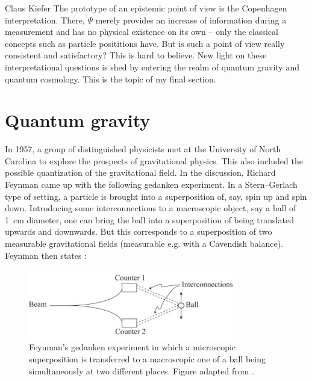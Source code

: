 \begin{artengenv}{Claus Kiefer}
The prototype of an epistemic point of view is the Copenhagen
interpretation. There, $\Psi$ merely provides an increase of information
during a measurement and has no physical existence on its own -- only
the classical concepts such as particle posititions have. But is such
a point of view really consistent and satisfactory?  This is hard to
believe. New light on these interpretational questions is shed by
entering the realm of quantum gravity and quantum cosmology. This is
the topic of my final section.

 

\section{Quantum gravity}


In 1957, a group of distinguished physicists met at the University of
North Carolina to explore the prospects of gravitational physics.
This also included the possible quantization of the
gravitational field. In the discussion, Richard Feynman came up with
the following 
gedanken experiment. In a Stern--Gerlach type of setting, a particle
is brought into a superposition of, say, spin up and spin
down. Introducing some interconnections to a macroscopic object, say
a ball of 1~cm diameter, one can bring the ball into a superposition of being
translated upwards and downwards. But this corresponds to a
superposition of two measurable gravitational fields (measurable e.g. with a
Cavendish balance). Feynman then states \parencite{de_witt_proceedings:_1957}:


\begin{figure}[h]
	\centering
   \includegraphics[width=0.8\textwidth]{ART_Kiefer/Kiefer_img.pdf} 
\caption{Feynman's gedanken experiment in which a microscopic
  superposition is transferred to a macroscopic one of a ball being
  simultaneously at two different places. Figure adapted from \cite{de_witt_proceedings:_1957}.}
\end{figure}


\end{artengenv}
